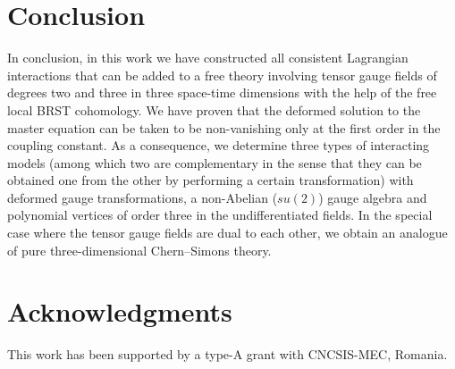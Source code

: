 \documentclass[a4paper,11pt]{article}
\begin{document}
\section{Conclusion}

In conclusion, in this work we have constructed all consistent Lagrangian
interactions that can be added to a free theory involving tensor gauge
fields of degrees two and three in three space-time dimensions with the help
of the free local BRST cohomology. We have proven that the deformed solution
to the master equation can be taken to be non-vanishing only at the first
order in the coupling constant. As a consequence, we determine three types
of interacting models (among which two are complementary in the sense that
they can be obtained one from the other by performing a certain
transformation) with deformed gauge transformations, a non-Abelian ($su(2)$)
gauge algebra and polynomial vertices of order three in the undifferentiated
fields. In the special case where the tensor gauge fields are dual to each
other, we obtain an analogue of pure three-dimensional Chern--Simons theory.

\section*{Acknowledgments}

This work has been supported by a type-A grant with CNCSIS-MEC, Romania.
\end{document}
